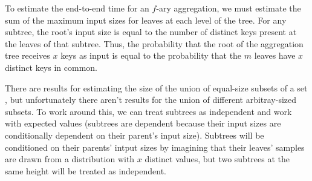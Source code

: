 \documentclass[twocolumn, 10pt]{article}
\begin{document}
To estimate the end-to-end time for an $f$-ary aggregation, we must
estimate the sum of the maximum input sizes for leaves at each level of the
tree.  For any subtree, the root's input size is equal to the number of
distinct keys present at the leaves of that subtree.  Thus, the probability
that the root of the aggregation tree receives $x$ keys as input is equal to
the probability that the $m$ leaves have $x$ distinct keys in common.

There are results for estimating the size of the union of equal-size subsets
of a set \cite{union-of-subsets}, but unfortunately there aren't results for
the union of different arbitray-sized subsets.
To work around this, we can treat subtrees as independent and work with
expected values (subtrees are dependent because their input sizes are
conditionally dependent on their parent's input size).  Subtrees will be
conditioned on their parents' intput sizes by imagining that their leaves'
samples are drawn from a distribution with $x$ distinct values, but two
subtrees at the same height will be treated as independent.


%
%
%
\end{document}
